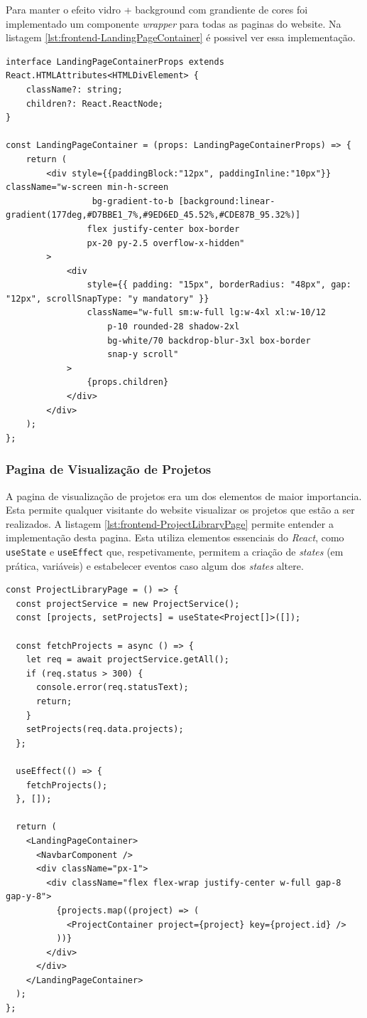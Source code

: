 Para manter o efeito vidro + background com grandiente de cores foi implementado um componente \textit{wrapper} para todas as paginas do website. Na listagem \ref{lst:frontend-LandingPageContainer} é possivel ver essa implementação.

\begin{lstlisting}[caption={Função LandingPageContainer}, label={lst:frontend-LandingPageContainer}]
interface LandingPageContainerProps extends React.HTMLAttributes<HTMLDivElement> {
	className?: string;
    children?: React.ReactNode;
}

const LandingPageContainer = (props: LandingPageContainerProps) => {
    return (
        <div style={{paddingBlock:"12px", paddingInline:"10px"}} className="w-screen min-h-screen
            	 bg-gradient-to-b [background:linear-gradient(177deg,#D7BBE1_7%,#9ED6ED_45.52%,#CDE87B_95.32%)]
            	flex justify-center box-border
				px-20 py-2.5 overflow-x-hidden"
		>
			<div
				style={{ padding: "15px", borderRadius: "48px", gap: "12px", scrollSnapType: "y mandatory" }}
				className="w-full sm:w-full lg:w-4xl xl:w-10/12
            		p-10 rounded-28 shadow-2xl
            		bg-white/70 backdrop-blur-3xl box-border
					snap-y scroll"
			>
				{props.children}
			</div>
		</div>
    );
};
\end{lstlisting}

\subsubsection{Pagina de Visualização de Projetos}

A pagina de visualização de projetos era um dos elementos de maior importancia. Esta permite qualquer visitante do website visualizar os projetos que estão a ser realizados. A listagem \ref{lst:frontend-ProjectLibraryPage} permite entender a implementação desta pagina. Esta utiliza elementos essenciais do \textit{React}, como \lstinline|useState| e \lstinline|useEffect| que, respetivamente, permitem a criação de \textit{states} (em prática, variáveis) e estabelecer eventos caso algum dos \textit{states} altere.  

\begin{lstlisting}[caption={Função ProjectLibraryPage}, label={lst:frontend-ProjectLibraryPage}]
const ProjectLibraryPage = () => {
  const projectService = new ProjectService();
  const [projects, setProjects] = useState<Project[]>([]);

  const fetchProjects = async () => {
    let req = await projectService.getAll();
    if (req.status > 300) {
      console.error(req.statusText);
      return;
    }
    setProjects(req.data.projects);
  };

  useEffect(() => {
    fetchProjects();
  }, []);

  return (
    <LandingPageContainer>
      <NavbarComponent />
      <div className="px-1">
        <div className="flex flex-wrap justify-center w-full gap-8 gap-y-8">
          {projects.map((project) => (
            <ProjectContainer project={project} key={project.id} />
          ))}
        </div>
      </div>
    </LandingPageContainer>
  );
};
\end{lstlisting}

